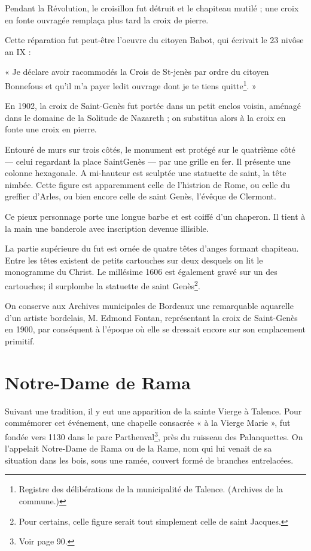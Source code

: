 Pendant la Révolution, le croisillon fut détruit et le chapiteau mutilé ; une croix en fonte ouvragée remplaça plus tard la croix de pierre.

Cette réparation fut peut-être l'oeuvre du citoyen Babot, qui écrivait le 23 nivôse an IX : 

« Je déclare avoir racommodés la Crois de St-jenès par ordre du citoyen Bonnefous et qu'il m'a payer ledit ouvrage dont je te tiens quitte\footnote{Registre des délibérations de la municipalité de Talence. (Archives de la commune.)}. »

En 1902, la croix de Saint-Genès fut portée dans un petit enclos voisin, aménagé dans le domaine de la Solitude de Nazareth ; on substitua alors à la croix en fonte une croix en pierre.

Entouré de murs sur trois côtés, le monument est protégé sur le quatrième côté — celui regardant la place SaintGenès — par une grille en fer. Il présente une colonne hexagonale. A mi-hauteur est sculptée une statuette de saint, la tête nimbée. Cette figure est apparemment celle de l'histrion de Rome, ou celle du greffier d'Arles, ou bien encore celle de saint Genès, l'évêque de Clermont.

Ce pieux personnage porte une longue barbe et est coiffé d'un chaperon. Il tient à la main une banderole avec inscription devenue illisible.

La partie supérieure du fut est ornée de quatre têtes d'anges formant chapiteau. Entre les têtes existent de petits cartouches sur deux desquels on lit le monogramme du Christ. Le millésime 1606 est également gravé sur un des cartouches; il surplombe la statuette de saint Genès\footnote{Pour certains, celle figure serait tout simplement celle de saint Jacques.}.

On conserve aux Archives municipales de Bordeaux une remarquable aquarelle d'un artiste bordelais, M. Edmond Fontan, représentant la croix de Saint-Genès en 1900, par conséquent à l'époque où elle se dressait encore sur son emplacement primitif.

\section{Notre-Dame de Rama}

Suivant une tradition, il y eut une apparition de la sainte Vierge à Talence. Pour commémorer cet événement, une chapelle consacrée « à la Vierge Marie », fut fondée vers 1130 dans le parc Parthenval\footnote{Voir page 90.}, près du ruisseau des Palanquettes. On l'appelait Notre-Dame de Rama ou de la Rame, nom qui lui venait de sa situation dans les bois, sous une ramée, couvert formé de branches entrelacées.

